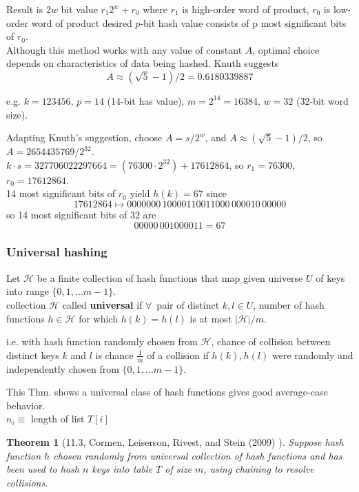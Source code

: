 \documentclass[10pt]{amsart}
\newtheorem{theorem}{Theorem}
\begin{document}
\begin{multicols*}{2}
Result is $2w$ bit value $r_1 2^w + r_0$ where $r_1$ is high-order word of product, $r_0$ is low-order word of product desired $p$-bit hash value consists of p most significant bits of $r_0$. \\

Although this method works with any value of constant $A$, optimal choice depends on characteristics of data being hashed. Knuth suggests
\[
A \approx (\sqrt{5} - 1) / 2 = 0.6180339887
\]

e.g. $k= 123456, \, p = 14$ (14-bit has value), $m = 2^{14} = 16384, \, w = 32$ (32-bit word size).

Adapting Knuth's suggestion, choose $A = s/2^w$, and $A \approx (\sqrt{5} - 1) / 2$, so $A = 2654435769 / 2^{32}$. \\
$ k \cdot s = 327706022297664 = (76300 \cdot 2^{32}) + 17612864$, so $r_1 = 76300$, $r_0 = 17612864$. \\
14 most significant bits of $r_0$ yield $h(k) = 67$ since 
\[
17612864 \mapsto 0000000 \, 10000110011000 \, 000010 \, 00000
\]
so 14 most significant bits of 32 are 
\[
00000 \, 00 1000011 = 67
\]

\subsubsection{Universal hashing}

Let $\mathcal{H}$ be a finite collection of hash functions that map given universe $U$ of keys into range $\lbrace 0 ,1 , \dots m -1 \rbrace$. \\
collection $\mathcal{H}$ called \textbf{universal} if $\forall \, $ pair of distinct $k, l \in U$, number of hash functions $h \in \mathcal{H}$ for which $h(k) = h(l)$ is at most $|\mathcal{H}| / m$.

i.e. with hash function randomly chosen from $\mathcal{H}$, chance of collision between distinct keys $k$ and $l$ is chance $\frac{1}{m}$ of a collision if $h(k), h(l)$ were randomly and independently chosen from $\lbrace 0, 1, \dots m -1 \rbrace$.

This Thm. shows a universal class of hash functions gives good average-case behavior. \\
$n_i \equiv $ length of list $T[i]$

\begin{theorem}[11.3, Cormen, Leiserson, Rivest, and Stein (2009) \cite{CLRS2009}]
Suppose hash function $h$ chosen randomly from universal collection of hash functions and has been used to hash $n$ keys into table $T$ of size $m$, using chaining to resolve collisions.


\end{theorem}
\end{multicols*}
\end{document}
